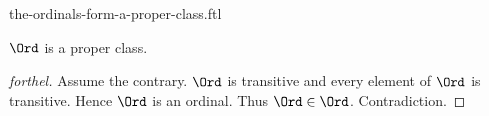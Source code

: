 \documentclass{naproche-library}
\begin{document}
\begin{smodule}[title=The Ordinals Form a Proper Class -- Burali-Forti's Paradox]{the-ordinals-form-a-proper-class.ftl}
  
\begin{theorem*}[forthel,title=Burali-Forti's Paradox,id=burali_forti_paradox]
  $\Ord$ is a proper class.
\end{theorem*}
\begin{proof}[forthel]
  Assume the contrary.
  $\Ord$ is transitive and every element of $\Ord$ is transitive.
  Hence $\Ord$ is an ordinal.
  Thus $\Ord \in \Ord$.
  Contradiction.
\end{proof}
\end{smodule}
\end{document}
